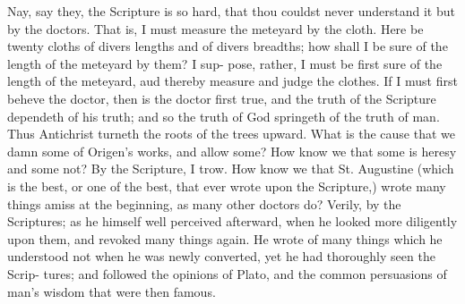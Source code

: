 \documentclass{custom}
\begin{document}
Nay, say they, the Scripture is so hard, that 
thou couldst never understand it but by the doctors. 
That is, I must measure the meteyard by the 
cloth. Here be twenty cloths of divers lengths 
and of divers breadths; how shall I be sure of 
the length of the meteyard by them? I sup- 
pose, rather, I must be first sure of the length of 
the meteyard, aud thereby measure and judge 
the clothes. If I must first beheve the doctor,
then is the doctor first true, and the truth of the 
Scripture dependeth of his truth; and so the 
truth of God springeth of the truth of man. 
Thus Antichrist turneth the roots of the trees 
upward. What is the cause that we damn 
some of Origen's works, and allow some? How 
know we that some is heresy and some not? 
By the Scripture, I trow. How know we that 
St. Augustine (which is the best, or one of the 
best, that ever wrote upon the Scripture,) wrote 
many things amiss at the beginning, as many 
other doctors do? Verily, by the Scriptures; 
as he himself well perceived afterward, when he 
looked more diligently upon them, and revoked 
many things again. He wrote of many things 
which he understood not when he was newly 
converted, yet he had thoroughly seen the Scrip- 
tures; and followed the opinions of Plato, and 
the common persuasions of man's wisdom that 
were then famous. 
\end{document}
